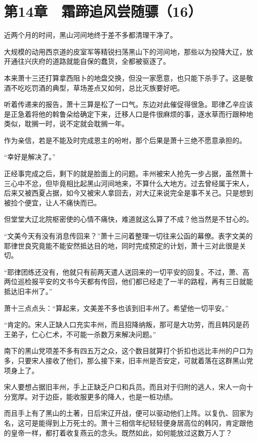 \section{第14章　霜蹄追风尝随骠（16）}

近两个月的时间，黑山河间地终于差不多都清理干净了。

大规模的动用西京道的皮室军等精锐扫荡黑山下的河间地，那些以为投降大辽，放开通往兴庆府的道路就能自保的蠢货，全都被驱逐了。

本来萧十三还打算拿西阻卜的地盘交换，但没一家愿意，也只能下杀手了。这是敬酒不吃吃罚酒的典型，草场差点又如何，总比灭族要好吧。

听着传递来的报告，萧十三算是松了一口气。东边对此催促得很急。耶律乙辛应该是正急着将他的斡鲁朵给确定下来，迁移人口是件很麻烦的事，逐水草而行跟种地类似，耽搁一时，说不定就会耽搁一年。

作为亲信，若是不能及时完成恩主的吩咐，那个后果是萧十三绝不愿意承担的。

“幸好是解决了。”

正经事完成之后，剩下的就是脸面上的问题。丰州被宋人抢先一步占据，虽然萧十三心中不忿，但毕竟相比起黑山河间地来，不算什么大地方。过去曾经属于宋人，后来又被西夏占据，如今又被宋人拿回去，对大辽来说完全是事不关己。只是想到被捡个便宜，让人不痛快而已。

但堂堂大辽北院枢密使的心情不痛快，难道就这么算了不成？他当然是不甘心的。

“文美今天有没有消息传回来？”萧十三问着整理一切往来公函的幕僚。表字文美的耶律世良究竟能不能安然抵达目的地，同时完成预定的计划，萧十三对此很是关切。

“耶律团练还没有，他就只有前两天遣人送回来的一切平安的回复。不过，萧、高两位巡检报平安的文书今天都有传回，他们都已经走了一半的路程，再有三日就能抵达旧丰州了。”

萧十三点点头：“算起来，文美差不多也该到旧丰州了。希望他一切平安。”

“肯定的。宋人正缺人口充实丰州，而且招降纳叛，那可是大功劳，而且韩冈是药王弟子，仁心仁术，不可能一杀数万来解决问题。”

南下的黑山党项差不多有四五万之众，这个数目就算打个折扣也远比丰州的户口为多，只要宋人接收了他们，那么接下来，旧丰州是否安定，可就着落在这群黑山党项身上了。

宋人要想占据旧丰州，手上正缺乏户口和兵员。而且对于归附的逃人，宋人一向十分宽厚。对于边臣，能收服更多的降人，也是一桩功绩。

而且手上有了黑山的土著，日后宋辽开战，便可以驱动他们上阵。以复仇、回家为名，这可是能得到上万死士的。萧十三相信年纪轻轻便身居高位的韩冈，肯定跟他的皇帝一样，都打着收复燕云的念头。既然如此，如何能放过这数万人丁？

